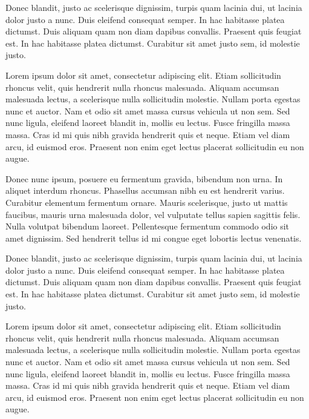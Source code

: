 \documentclass[12pt,lot,lof]{quthesis}
\begin{document}
\begin{appendices}
Donec blandit, justo ac scelerisque dignissim, turpis quam lacinia dui, ut lacinia dolor justo a nunc. Duis eleifend consequat semper. In hac habitasse platea dictumst. Duis aliquam quam non diam dapibus convallis. Praesent quis feugiat est. In hac habitasse platea dictumst. Curabitur sit amet justo sem, id molestie justo.

Lorem ipsum dolor sit amet, consectetur adipiscing elit. Etiam sollicitudin rhoncus velit, quis hendrerit nulla rhoncus malesuada. Aliquam accumsan malesuada lectus, a scelerisque nulla sollicitudin molestie. Nullam porta egestas nunc et auctor. Nam et odio sit amet massa cursus vehicula ut non sem. Sed nunc ligula, eleifend laoreet blandit in, mollis eu lectus. Fusce fringilla massa massa. Cras id mi quis nibh gravida hendrerit quis et neque. Etiam vel diam arcu, id euismod eros. Praesent non enim eget lectus placerat sollicitudin eu non augue.

Donec nunc ipsum, posuere eu fermentum gravida, bibendum non urna. In aliquet interdum rhoncus. Phasellus accumsan nibh eu est hendrerit varius. Curabitur elementum fermentum ornare. Mauris scelerisque, justo ut mattis faucibus, mauris urna malesuada dolor, vel vulputate tellus sapien sagittis felis. Nulla volutpat bibendum laoreet. Pellentesque fermentum commodo odio sit amet dignissim. Sed hendrerit tellus id mi congue eget lobortis lectus venenatis.

Donec blandit, justo ac scelerisque dignissim, turpis quam lacinia dui, ut lacinia dolor justo a nunc. Duis eleifend consequat semper. In hac habitasse platea dictumst. Duis aliquam quam non diam dapibus convallis. Praesent quis feugiat est. In hac habitasse platea dictumst. Curabitur sit amet justo sem, id molestie justo.

Lorem ipsum dolor sit amet, consectetur adipiscing elit. Etiam sollicitudin rhoncus velit, quis hendrerit nulla rhoncus malesuada. Aliquam accumsan malesuada lectus, a scelerisque nulla sollicitudin molestie. Nullam porta egestas nunc et auctor. Nam et odio sit amet massa cursus vehicula ut non sem. Sed nunc ligula, eleifend laoreet blandit in, mollis eu lectus. Fusce fringilla massa massa. Cras id mi quis nibh gravida hendrerit quis et neque. Etiam vel diam arcu, id euismod eros. Praesent non enim eget lectus placerat sollicitudin eu non augue.

\end{appendices}
\end{document}
